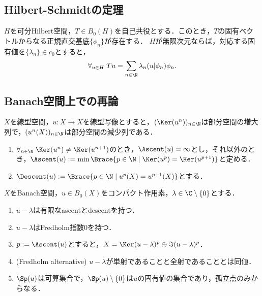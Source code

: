 \documentclass[uplatex,dvipdfmx]{jsreport}
\begin{document}
\subsection{Hilbert-Schmidtの定理}

\begin{theorem}
    $H$を可分Hilbert空間，$T\in B_0(H)$を自己共役とする．このとき，$T$の固有ベクトルからなる正規直交基底$\{\phi_n\}$が存在する．
    $H$が無限次元ならば，対応する固有値を$\{\lambda_n\}\in c_0$とすると，
    \[\forall_{u\in H}\;Tu=\sum_{n\in\N}\lambda_n(u|\phi_n)\phi_n.\]
\end{theorem}

\subsection{Banach空間上での再論}

\begin{definition}
    $X$を線型空間，$u:X\to X$を線型写像とすると，$(\Ker(u^n))_{n\in\N}$は部分空間の増大列で，$(u^n(X))_{n\in\N}$は部分空間の減少列である．
    \begin{enumerate}
        \item $\forall_{n\in\N}\;\Ker(u^n)\ne\Ker(u^{n+1})$のとき，$\Ascent(u)=\infty$とし，それ以外のとき，$\Ascent(u):=\min\Brace{p\in\N\mid\Ker(u^p)=\Ker(u^{p+1})}$と定める．
        \item $\Descent(u):=\Brace{p\in\N\mid u^p(X)=u^{p+1}(X)}$とする．
    \end{enumerate}
\end{definition}

\begin{theorem}
    $X$をBanach空間，$u\in B_0(X)$をコンパクト作用素，$\lambda\in\C\setminus\{0\}$とする．
    \begin{enumerate}
        \item $u-\lambda$は有限なascentとdescentを持つ．
        \item $u-\lambda$はFredholm指数$0$を持つ．
        \item $p:=\Ascent(u)$とすると，$X=\Ker(u-\lambda)^p\oplus\Im(u-\lambda)^p$．
        \item (Fredholm alternative) $u-\lambda$が単射であることと全射であることとは同値．
        \item $\Sp(u)$は可算集合で，$\Sp(u)\setminus\{0\}$は$u$の固有値の集合であり，孤立点のみからなる．
    \end{enumerate}
\end{theorem}
\end{document}
